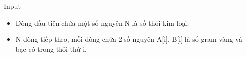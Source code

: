 Input  
\begin{itemize}
	\item     Dòng đầu tiên chứa một số nguyên N là số thỏi kim loại.   
	\item     N dòng tiếp theo, mỗi dòng chứa 2 số nguyên A[i], B[i] là số gram vàng và bạc có trong thỏi thứ i.   
\end{itemize}